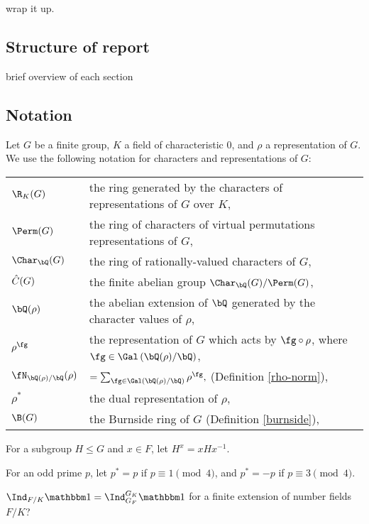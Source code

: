{\color{red} wrap it up.}


\subsection*{Structure of report}

{\color{red} brief overview of each section}



\subsection*{Notation}
Let $G$ be a finite group, $K$ a field of characteristic $0$, and $\rho$ a representation of $G$. We use the following notation for characters and representations of $G$:

\bigskip

\begin{tabular}{l | l}
     $\R_{K}(G)$ & the ring generated by the characters of representations of $G$ over $K$,\\
    $\Perm(G)$ & the ring of characters of virtual permutations representations of $G$, \\
    $\Char_{\bQ}(G)$ & the ring of rationally-valued characters of $G$,\\ 
    $\hat{C}(G)$ & the finite abelian group $\Char_{\bQ}(G) / \Perm(G)$, \\ 
    $\bQ(\rho)$ & the abelian extension of $\bQ$ generated by the character values of $\rho$, \\
    $\rho^{\fg}$ & the representation of $G$ which acts by $\fg \circ \rho$, where $\fg \in \Gal\left(\bQ(\rho) / \bQ\right)$,\\
    $\repnorm{\rho}$ &  $ = \sum_{\fg \in \Gal(\bQ(\rho) / \bQ)} \rho^{\fg},$ (Definition \ref{rho-norm}),\\
    $\rho^*$ & the dual representation of $\rho$,
    \\
    $\B(G)$ & the Burnside ring of $G$ (Definition \ref{burnside}), \\
\end{tabular}
\vspace{1em}

For a subgroup $H \leq G$ and $x \in F$, let $H^{x} = x H x^{-1}$.  

For an odd prime $p$, let $p^* = p$ if $p \equiv 1 \pmod 4$, and $p^* = -p$ if $p \equiv 3 \pmod 4$. 

$\Ind_{F / K} \trivial  = \Ind_{G_F}^{G_K} \trivial$ for a finite extension of number fields $F / K$?

